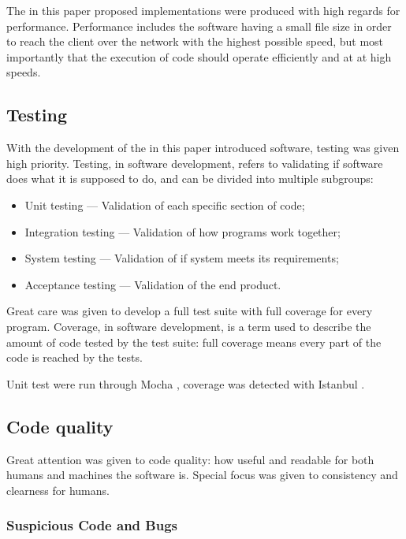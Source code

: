 The in this paper proposed implementations were produced with high
regards for performance. Performance includes the software having a
small file size in order to reach the client over the network with the
highest possible speed, but most importantly that the execution of code
should operate efficiently and at at high speeds.

\subsection{Testing}\label{testing}

With the development of the in this paper introduced software, testing
was given high priority. Testing, in software development, refers to
validating if software does what it is supposed to do, and can be
divided into multiple subgroups:

\begin{itemize}
\itemsep1pt\parskip0pt
\item
  Unit testing --- Validation of each specific section of code;
\item
  Integration testing --- Validation of how programs work together;
\item
  System testing --- Validation of if system meets its requirements;
\item
  Acceptance testing --- Validation of the end product.
\end{itemize}

Great care was given to develop a full test suite with full coverage for
every program. Coverage, in software development, is a term used to
describe the amount of code tested by the test suite: full coverage
means every part of the code is reached by the tests.

Unit test were run through Mocha
\autocite{visionmedia/mocha-source-code}, coverage was detected with
Istanbul \autocite{gotwarlost/istanbul-source-code}.

\subsection{Code quality}\label{code-quality}

Great attention was given to code quality: how useful and readable for
both humans and machines the software is. Special focus was given to
consistency and clearness for humans.

\subsubsection{Suspicious Code and Bugs}\label{suspicious-code-and-bugs}

